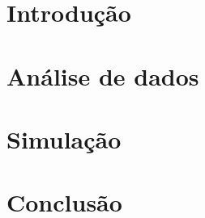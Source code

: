 \documentclass[11pt]{article}
\begin{document}


\newpage{}
\tableofcontents{}
\newpage{}

\section{Introdução}
\label{section: intro}


\section{Análise de dados}









\section{Simulação}


\section{Conclusão}
\label{section: conclusao}

\end{document}
